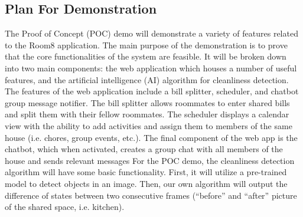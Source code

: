 \documentclass{article}
\begin{document}
\subsection{Plan For Demonstration}
The Proof of Concept (POC) demo will demonstrate a variety of features related to the Room8 application. The main purpose of the demonstration is to prove that the core functionalities of the system are feasible. It will be broken down into two main components: the web application which houses a number of useful features, and the artificial intelligence (AI) algorithm for cleanliness detection. The features of the web application include a bill splitter, scheduler, and chatbot group message notifier. The bill splitter allows roommates to enter shared bills and split them with their fellow roommates. The scheduler displays a calendar view with the ability to add activities and assign them to members of the same house (i.e. chores, group events, etc.). The final component of the web app is the chatbot, which when activated, creates a group chat with all members of the house and sends relevant messages For the POC demo, the cleanliness detection algorithm will have some basic functionality. First, it will utilize a pre-trained model to detect objects in an image. Then, our own algorithm will output the difference of states between two consecutive frames (“before” and “after” picture of the shared space, i.e. kitchen).
\end{document}
